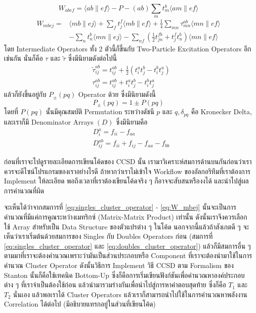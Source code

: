 %
\begin{equation}
  \label{eq:W_abef}
  W_{a b e f}
  =
  \langle a b \| e f\rangle-P-(a b) \sum_m t_m^b\langle a m \| e f\rangle
\end{equation}
%
\begin{equation}
  \label{eq:W_mbej}
  \begin{aligned}
    W_{m b e j}
    =
     & \langle m b \| e j\rangle+\sum_f t_j^f\langle m b \| e f\rangle
    + \frac{1}{4} \sum_{m n} \tau_{m n}^{a b}\langle m n \| e f\rangle \\
     & - \sum_n t_n^b\langle m n \| e j\rangle
    - \sum_{n f}\left(\frac{1}{2} t_{j n}^{f b}+t_j^f t_n^b\right)\langle m n \| e f\rangle
  \end{aligned}
\end{equation}
%
โดย Intermediate Operators ทั้ง 2 ตัวนี้ก็ขึ้นกับ Two-Particle Excitation Operators อีกเช่นกัน นั่นก็คือ $\tau$ และ $\tilde{\tau}$ ซึ่งมีนิยามดังต่อไปนี้
%
\begin{align}
  \label{eq:tau_abij_tilde}
   & \tilde{\tau}_{i j}^{a b}
  =
  t_{i j}^{a b}+\frac{1}{2}\left(t_i^a t_j^b-t_i^b t_j^a\right) \\
  \label{eq:tau_abij}
   & \tau_{i j}^{a b}
  =
  t_{i j}^{a b}+t_i^a t_j^b-t_i^b t_j^a
\end{align}
%
แล้วก็ยังขึ้นอยู่กับ $P_{ \pm}(p q)$ Operator ด้วย ซึ่งมีนิยามดังนี้
%
\begin{equation}
  P_{ \pm}(p q)
  =
  1 \pm P(p q)
\end{equation}
%
โดยที่ $P(p q)$ นั้นมีคุณสมบัติ Permutation ระหว่างดัชนี $p$ และ $q, \delta_{p q}$ คือ Kronecker
Delta, และเราก็มี Denominator Arrays $(D)$ ซึ่งมีนิยามคือ
%
\begin{align}
  \label{eq:D_ai}
   & D_i^a
  =
  f_{i i}-f_{a a}  \\
  \label{eq:D_abij}
   & D_{i j}^{a b}
  =
  f_{i i}+f_{i j}-f_{a a}-f_{b b}
\end{align}

ก่อนที่เราจะไปดูรายละเอียดการเขียนโค้ดของ CCSD นั้น เรามาวิเคราะห์สมการด้านบนกันก่อนว่าเราควรจะดีไซน์โปรแกรมของเราอย่างไรดี ถ้าหากว่าเราไม่เข้าใจ Workflow ของอัลกอริทึมที่เราต้องการ Implement ให้ละเอียด พอถึงเวลาที่เราต้องเขียนโค้ดจริง ๆ ก็อาจจะสับสนหรืองงได้ และนำไปสู่ผลการคำนวณที่ผิด

จะเห็นได้ว่าจากสมการที่ \eqref{eq:singles_cluster_operator} - \eqref{eq:W_mbej} นั้นจะเป็นการคำนวณที่มีแค่การคูณระหว่างเมทริกซ์ (Matrix-Matrix Product) เท่านั้น ดังนั้นเราจึงควรเลือกใช้ Array สำหรับเป็น Data Structure ของตัวแปรต่าง ๆ ในโค้ด นอกจากนี้แล้วถ้าสังเกตดี ๆ จะเห็นว่าเราเริ่มต้นด้วยสมการของ Singles กับ Doubles Operators ก่อน (สมการที่ \eqref{eq:singles_cluster_operator} และ \eqref{eq:doubles_cluster_operator}) แล้วก็มีสมการอื่น ๆ ตามมาที่เราจะต้องคำนวณเพราะว่ามันเป็นส่วนประกอบหรือ Component ที่เราจะต้องนำมาใช้ในการคำนวณ Cluster Operator ดังนั้นวิธีการ Implement วิธี CCSD ตาม Formalism ของ Stanton นั้นก็คือใช้เทคนิค Bottom-Up ซึ่งก็คือการเริ่มเขียนฟังก์ชันเพื่อคำนวณหาองค์ประกอบต่าง ๆ ที่เราจำเป็นต้องใช้ก่อน แล้วนำมารวมร่างกันเพื่อนำไปสู่การหาคำตอบสุดท้าย ซึ่งก็คือ $T_{1}$ และ $T_{2}$ นั่นเอง แล้วพอเราได้ Cluster Operators แล้วเราก็สามารถนำไปใช้ในการคำนวณหาพลังงาน Correlation ได้ต่อไป (มีอธิบายแทรกอยู่ในส่วนที่เขียนโค้ด)

